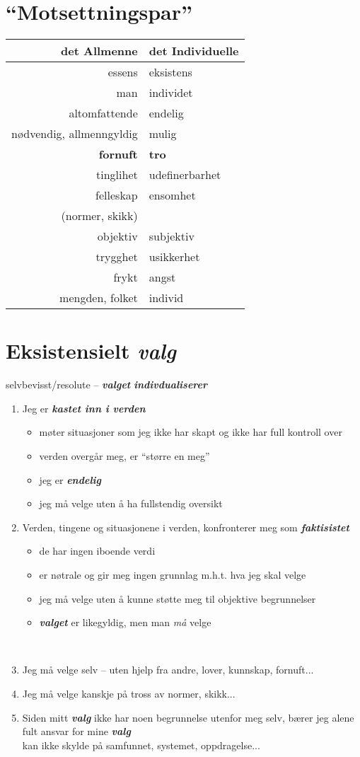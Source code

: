 \documentclass[12pt]{article}
\newcommand{\co}[1]{{\bf\em #1\/}}
\begin{document}
\newpage
\section*{``Motsettningspar''}
\begin{tabular}{r@{\ \ -\ \ }l}
det Allmenne & det Individuelle \\ \hline
essens & eksistens \\
man & individet \\
altomfattende & endelig \\
n{\o}dvendig, allmenngyldig & mulig \\ \hline
{\bf fornuft} & {\bf tro} \\ 
tinglihet & udefinerbarhet \\
felleskap & ensomhet \\
(normer, skikk) \\
objektiv & subjektiv\\
trygghet & usikkerhet \\
frykt & angst \\
mengden, folket & individ
\end{tabular}
\newpage
\section*{Eksistensielt \co{valg}}
selvbevisst/resolute -- \co{valget} \co{indivdualiserer}
\begin{enumerate}
\item Jeg er \co{kastet inn i verden}
\begin{itemize}
\item
m{\o}ter situasjoner som jeg ikke har skapt og ikke har full kontroll
over
\item verden overg{\aa}r meg, er ``st{\o}rre en meg''
\item jeg er \co{endelig}
\item jeg m{\aa} velge uten {\aa} ha fullstendig oversikt
\end{itemize}
\item Verden, tingene og situasjonene i verden, konfronterer meg som
\co{faktisistet}
\begin{itemize}
\item de har ingen iboende verdi
\item er n{\o}trale og gir meg ingen grunnlag m.h.t. hva jeg skal velge
\item jeg m{\aa} velge uten {\aa} kunne st{\o}tte meg til objektive begrunnelser
\item \co{valget} er likegyldig, men man {\em m{\aa}} velge
\end{itemize}
\ \dotfill
\item Jeg m{\aa} velge selv -- uten hjelp fra andre, lover, kunnskap, fornuft...
\item Jeg m{\aa} velge kanskje p{\aa} tross av normer, skikk...
\item Siden mitt \co{valg} ikke har noen begrunnelse utenfor meg selv, b{\ae}rer
jeg alene fult ansvar for mine \co{valg}\\
kan ikke skylde p{\aa} samfunnet, systemet, oppdragelse...
\end{enumerate}
\end{document}
